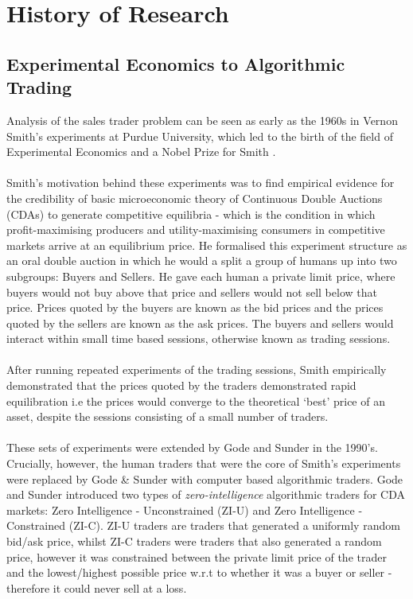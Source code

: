 \documentclass[ %
                    author={Ashwinder Khurana},
                supervisor={Prof Dave Cliff},
                    degree={MEng},
                     title={The Deeply Reinforced Trader},
                  subtitle={},
                      type={enterprise},
                      year={2020} ]{dissertation}
\begin{document}
\section{History of Research}
\label{section:History of Research}
\subsection{Experimental Economics to Algorithmic Trading}
\label{subsection:Experimental Economics to Algorithmic Trading}
Analysis of the sales trader problem can be seen as early as the 1960s in Vernon Smith's experiments at Purdue University, which led to the birth of the field of Experimental Economics and a Nobel Prize for Smith \cite{vernon-smith}. 
\\
\\
Smith's motivation behind these experiments was to find empirical evidence for the credibility of basic microeconomic theory of Continuous Double Auctions (CDAs) to generate competitive equilibria - which is the condition in which profit-maximising producers and utility-maximising consumers in competitive markets arrive at an equilibrium price\cite{Competitive-Equilibrium}. He formalised this experiment structure as an oral double auction in which he would a split a group of humans up into two subgroups: Buyers and Sellers. He gave each human a private limit price, where buyers would not buy above that price and sellers would not sell below that price. Prices quoted by the buyers are known as the bid prices and the prices quoted by the sellers are known as the ask prices. The buyers and sellers would interact within small time based sessions, otherwise known as trading sessions.
\\
\\
After running repeated experiments of the trading sessions, Smith empirically demonstrated that the prices quoted by the traders demonstrated rapid equilibration i.e the prices would converge to the theoretical \enquote*{best} price of an asset, despite the sessions consisting of a small number of traders.
\\
\\
These sets of experiments were extended by Gode and Sunder \cite{Gode-Sunder}  in the 1990's. Crucially, however, the human traders that were the core of Smith's experiments were replaced by Gode \& Sunder with computer based algorithmic traders. Gode and Sunder introduced two types of \textit{zero-intelligence} algorithmic traders for CDA markets: Zero Intelligence - Unconstrained (ZI-U) and Zero Intelligence - Constrained (ZI-C). ZI-U traders are traders that generated a uniformly random bid/ask price, whilst ZI-C traders were traders that also generated a random price, however it was constrained between the private limit price of the trader and the lowest/highest possible price w.r.t to whether it was a buyer or seller - therefore it could never sell at a loss.
\end{document}
